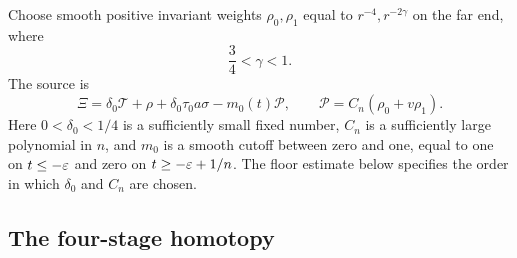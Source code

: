 Choose smooth positive invariant weights $\rho_0,\rho_1$ equal to
$r^{-4},r^{-2\gamma}$ on the far end, where
\begin{equation}\label{d:gamma}
 \frac34<\gamma<1.
\end{equation}
The source is
\begin{equation}\label{d:source}
 \Xi=\delta_0\mathcal T+\rho+\delta_0\tau_0a\sigma
               -m_0(t)\mathcal P,\qquad
 \mathcal P=C_n(\rho_0+v\rho_1).
\end{equation}
Here $0<\delta_0<1/4$ is a sufficiently small fixed number, $C_n$ is
a sufficiently large polynomial in $n$, and $m_0$ is a smooth cutoff
between zero and one, equal to one on $t\le-\varepsilon$ and zero on
$t\ge-\varepsilon+1/n$.  The floor estimate below specifies the order in
which $\delta_0$ and $C_n$ are chosen.

\subsection{The four-stage homotopy}\label{d:homotopy}

